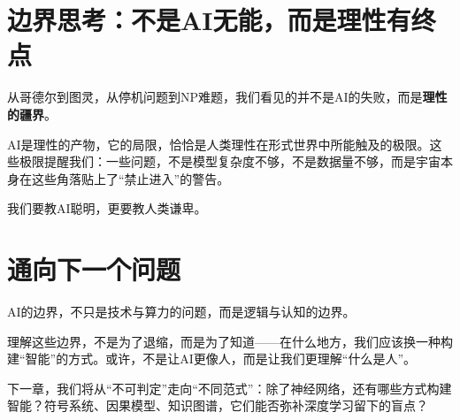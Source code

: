 \section*{边界思考：不是AI无能，而是理性有终点}

从哥德尔到图灵，从停机问题到NP难题，我们看见的并不是AI的失败，而是\textbf{理性的疆界}。

AI是理性的产物，它的局限，恰恰是人类理性在形式世界中所能触及的极限。这些极限提醒我们：一些问题，不是模型复杂度不够，不是数据量不够，而是宇宙本身在这些角落贴上了“禁止进入”的警告。

我们要教AI聪明，更要教人类谦卑。

\section*{通向下一个问题}

AI的边界，不只是技术与算力的问题，而是逻辑与认知的边界。

理解这些边界，不是为了退缩，而是为了知道——在什么地方，我们应该换一种构建“智能”的方式。或许，不是让AI更像人，而是让我们更理解“什么是人”。

下一章，我们将从“不可判定”走向“不同范式”：除了神经网络，还有哪些方式构建智能？符号系统、因果模型、知识图谱，它们能否弥补深度学习留下的盲点？

\nocite{*}
\printbibliography[heading=bibintoc, title=\ebibname]


\newpage
